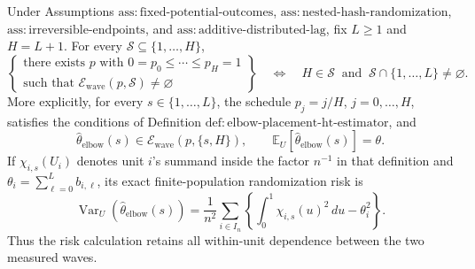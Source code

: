 Under Assumptions \(\mathrm{ass:fixed\text{-}potential\text{-}outcomes}\), \(\mathrm{ass:nested\text{-}hash\text{-}randomization}\), \(\mathrm{ass:irreversible\text{-}endpoints}\), and \(\mathrm{ass:additive\text{-}distributed\text{-}lag}\), fix \(L\geq1\) and \(H=L+1\).  For every \(\mathcal S\subseteq\{1,\ldots,H\}\),
\[
 \left\{
 \begin{array}{c}
 \text{there exists }p\text{ with }0=p_0\leq\cdots\leq p_H=1\\
 \text{such that }\mathcal E_{\mathrm{wave}}(p,\mathcal S)\ne\varnothing
 \end{array}
 \right\}
 \quad\Longleftrightarrow\quad
 H\in\mathcal S\ \text{ and }\
 \mathcal S\cap\{1,\ldots,L\}\ne\varnothing.
\]
More explicitly, for every \(s\in\{1,\ldots,L\}\), the schedule \(p_j=j/H\), \(j=0,\ldots,H\), satisfies the conditions of Definition \(\mathrm{def:elbow\text{-}placement\text{-}ht\text{-}estimator}\), and
\[
 \widehat\theta_{\mathrm{elbow}}(s)\in
 \mathcal E_{\mathrm{wave}}(p,\{s,H\}),
 \qquad
 \mathbb E_U\!\left[\widehat\theta_{\mathrm{elbow}}(s)\right]=\theta.
\]
If \(\chi_{i,s}(U_i)\) denotes unit \(i\)'s summand inside the factor \(n^{-1}\) in that definition and \(\theta_i=\sum_{\ell=0}^{L}b_{i,\ell}\), its exact finite-population randomization risk is
\[
 \operatorname{Var}_U\!\left(\widehat\theta_{\mathrm{elbow}}(s)\right)
 =\frac1{n^2}\sum_{i\in I_n}
 \left\{\int_0^1\chi_{i,s}(u)^2\,du-\theta_i^2\right\}.
\]
Thus the risk calculation retains all within-unit dependence between the two measured waves.